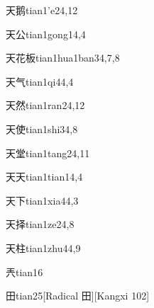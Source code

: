 \begin{verbete}{天鹅}{tian1'e2}{4,12}
\end{verbete}

\begin{verbete}{天公}{tian1gong1}{4,4}
\end{verbete}

\begin{verbete}{天花板}{tian1hua1ban3}{4,7,8}
\end{verbete}

\begin{verbete}{天气}{tian1qi4}{4,4}
\end{verbete}

\begin{verbete}{天然}{tian1ran2}{4,12}
\end{verbete}

\begin{verbete}{天使}{tian1shi3}{4,8}
\end{verbete}

\begin{verbete}{天堂}{tian1tang2}{4,11}
\end{verbete}

\begin{verbete}{天天}{tian1tian1}{4,4}
\end{verbete}

\begin{verbete}{天下}{tian1xia4}{4,3}
\end{verbete}

\begin{verbete}{天择}{tian1ze2}{4,8}
\end{verbete}

\begin{verbete}{天柱}{tian1zhu4}{4,9}
\end{verbete}

\begin{verbete}{兲}{tian1}{6}
\end{verbete}

\begin{verbete}{田}{tian2}{5}[Radical 田][Kangxi 102]
\end{verbete}

